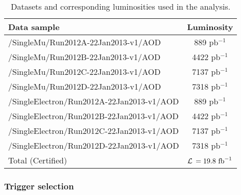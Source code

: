 \begin{table}[htb]
\begin{center}
\footnotesize
\begin{tabular}{|l|c|}\hline
  Data sample &  Luminosity \\ \hline
  /SingleMu/Run2012A-22Jan2013-v1/AOD & 889 pb$^{-1}$  \\
  /SingleMu/Run2012B-22Jan2013-v1/AOD & 4422 pb$^{-1}$   \\
  /SingleMu/Run2012C-22Jan2013-v1/AOD & 7137 pb$^{-1}$   \\
  /SingleMu/Run2012D-22Jan2013-v1/AOD & 7318 pb$^{-1}$ \\\hline  \hline
  /SingleElectron/Run2012A-22Jan2013-v1/AOD & 889 pb$^{-1}$  \\
  /SingleElectron/Run2012B-22Jan2013-v1/AOD & 4422 pb$^{-1}$   \\
  /SingleElectron/Run2012C-22Jan2013-v1/AOD & 7137 pb$^{-1}$   \\
  /SingleElectron/Run2012D-22Jan2013-v1/AOD & 7318 pb$^{-1}$ \\\hline  \hline
  
  Total (Certified) &  $\cal{L}$ $= 19.8~{\rm fb}^{-1}$  \\ \hline
\end{tabular}
\end{center}
\caption{Datasets and corresponding luminosities used in the analysis.} 
\label{tab:datasampleTS}
\end{table}


\subsubsection{Trigger selection}

